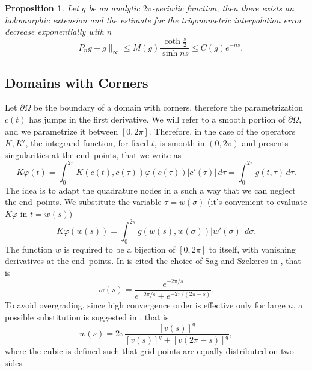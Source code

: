 \documentclass[10pt, a4paper, twoside, openright]{book}
\theoremstyle{definition}
\theoremstyle{plain}
\theoremstyle{plain}
\theoremstyle{plain}
\newtheorem{proposition}[subsection]{Proposition}
\theoremstyle{plain}
\theoremstyle{plain}
\theoremstyle{plain}
\theoremstyle{plain}
\theoremstyle{plain}
\let\phi\varphi
\begin{document}
\begin{proposition}
 Let $g$ be an analytic $2\pi$-periodic function, then there exists an holomorphic extension and the estimate for the trigonometric interpolation error decrease exponentially with $n$
 \begin{equation}
  \|P_ng - g\|_{\infty}\leq M(g)\frac{\coth\frac{s}{2}}{\sinh ns} \leq C(g)e^{-ns}.
 \end{equation}
\end{proposition}

\subsection{Domains with Corners}
Let $\partial \Omega$ be the boundary of a domain with corners, therefore the parametrization $c(t)$ has jumps in the first derivative.
We will refer to a smooth portion of $\partial \Omega$, and we parametrize it between $[0,2\pi]$. 
Therefore, in the case of the operators $K,K'$, the integrand function, for fixed $t$, is smooth in $(0,2\pi)$ and presents 
singularities at the end--points, that we write as
\begin{equation}
\label{eq:corners-double}
 K\phi(t)=\int_0^{2\pi}K(c(t),c(\tau))\phi(c(\tau))|c'(\tau)|\,d\tau=\int_0^{2\pi}g(t,\tau)\,d\tau.
\end{equation}
The idea is to adapt the quadrature nodes in a such a way that we can neglect the end--points.
We substitute the variable $\tau=w(\sigma)$ (it's convenient to evaluate $K\phi$ in $t=w(s)$)
\begin{equation}
\label{eq:corners-generic}
 K\phi(w(s))=\int_0^{2\pi}g(w(s),w(\sigma))|w'(\sigma)|\,d\sigma.
\end{equation}
The function $w$ is required to be a bijection of $[0,2\pi]$ to itself, with vanishing derivatives at the end--points. In \cite{kress:bie-scattering} is cited the choice of Sag and Szekeres in \cite{Sa-Sz64}, that is
\begin{equation}
 w(s)=\frac{e^{-2\pi/s}}{e^{-2\pi/s} + e^{-2\pi/(2\pi - s)}}.
\end{equation}
To avoid overgrading, since high convergence order is effective only for large $n$, a possible substitution is suggested in \cite{kress:bie-corners}, that is
\begin{equation}
 w(s)=2\pi\frac{[v(s)]^q}{[v(s)]^q + [v(2\pi - s)]^q},\label{eq:graded-parametrization-power}
\end{equation}
where the cubic is defined such that grid points are equally distributed on two sides
\end{document}
